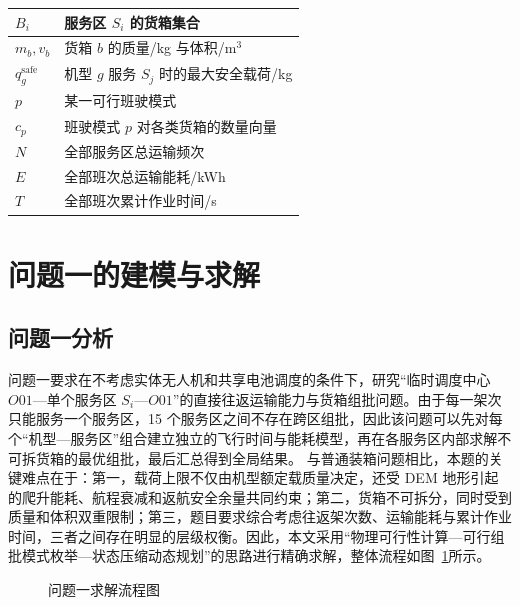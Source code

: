 \documentclass[bwprint,fontset=fandol]{gmcmthesis}
\begin{document}
\begin{table}[htp!]
\begin{tabularx}{0.9\textwidth}{|P{1.8cm}|L|}
  \hline
  $ B_i $  &  服务区 $ S_i $ 的货箱集合    \\
  \hline
  $ m_b, v_b $  &  货箱 $ b $ 的质量/kg 与体积/m$^3$    \\
  \hline
  $ q_g^{\mathrm{safe}} $  &  机型 $ g $ 服务 $ S_j $ 时的最大安全载荷/kg    \\
  \hline
  $ p $  &  某一可行班驶模式    \\
  \hline
  $ c_p $  &  班驶模式 $ p $ 对各类货箱的数量向量    \\
  \hline
  $ N $  &  全部服务区总运输频次    \\
  \hline
  $ E $  &  全部班次总运输能耗/kWh    \\
  \hline
  $ T $  &  全部班次累计作业时间/s    \\
  \hline
\end{tabularx}
\end{table}




\section{问题一的建模与求解}

\subsection{问题一分析}
问题一要求在不考虑实体无人机和共享电池调度的条件下，研究“临时调度中心 $O01$---单个服务区 $S_i$---$O01$”的直接往返运输能力与货箱组批问题。由于每一架次只能服务一个服务区，15 个服务区之间不存在跨区组批，因此该问题可以先对每个“机型—服务区”组合建立独立的飞行时间与能耗模型，再在各服务区内部求解不可拆货箱的最优组批，最后汇总得到全局结果。
与普通装箱问题相比，本题的关键难点在于：第一，载荷上限不仅由机型额定载质量决定，还受 DEM 地形引起的爬升能耗、航程衰减和返航安全余量共同约束；第二，货箱不可拆分，同时受到质量和体积双重限制；第三，题目要求综合考虑往返架次数、运输能耗与累计作业时间，三者之间存在明显的层级权衡。因此，本文采用“物理可行性计算—可行组批模式枚举—状态压缩动态规划”的思路进行精确求解，整体流程如图~\ref{fig:problem1_flow}所示。
\begin{figure}[htbp!]
  \centering
  \caption{问题一求解流程图}
  \label{fig:problem1_flow}
\end{figure}
\end{document}
